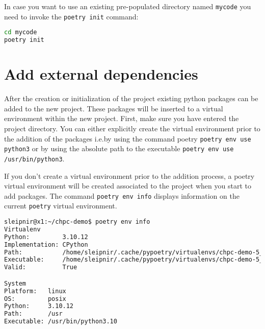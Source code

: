 \documentclass[10pt]{article}
\begin{document}
In case you want to use an existing pre-populated directory named \texttt{mycode} you need to invoke the \texttt{poetry init} command:
\begin{lstlisting}[language=bash]
cd mycode
poetry init
\end{lstlisting}

\section{Add external dependencies}
After the creation or initialization of the project existing python packages can be added to the new project.
These packages will be inserted to a virtual environment within the new project. First, make sure you have entered 
the project directory.
You can either explicitly create the virtual environment prior to the addition of the packages i.e.\;by using the 
command poetry \texttt{poetry env use python3} or by using the absolute path to the executable \texttt{poetry env use /usr/bin/python3}.

If you don't create a virtual environment prior to the addition process, a poetry virtual environment 
will be created associated to the project when you start to add packages.
The command \texttt{poetry env info} displays information on the current \texttt{poetry} virtual environment.
\begin{lstlisting}[language=bash]
sleipnir@x1:~/chpc-demo$ poetry env info
Virtualenv
Python:         3.10.12
Implementation: CPython
Path:           /home/sleipnir/.cache/pypoetry/virtualenvs/chpc-demo-5_MZDma8-py3.10
Executable:     /home/sleipnir/.cache/pypoetry/virtualenvs/chpc-demo-5_MZDma8-py3.10/bin/python
Valid:          True

System
Platform:   linux
OS:         posix
Python:     3.10.12
Path:       /usr
Executable: /usr/bin/python3.10
\end{lstlisting}
\end{document}
